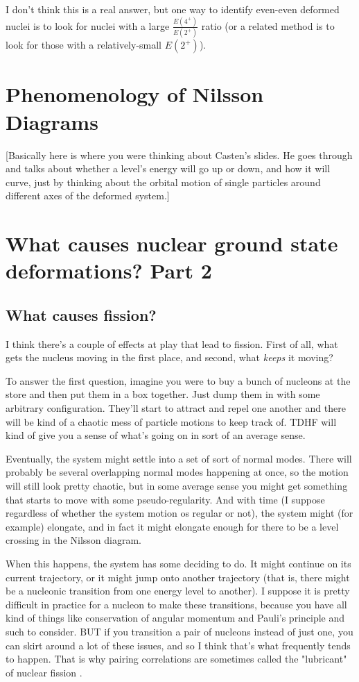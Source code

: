 I don't think this is a real answer, but one way to identify even-even deformed nuclei is to look for nuclei with a large $\frac{E(4^+)}{E(2^+)}$ ratio (or a related method is to look for those with a relatively-small $E(2^+)$).

\section{Phenomenology of Nilsson Diagrams}

[Basically here is where you were thinking about Casten's slides. He goes through and talks about whether a level's energy will go up or down, and how it will curve, just by thinking about the orbital motion of single particles around different axes of the deformed system.]

\section{What causes nuclear ground state deformations? Part 2}
\subsection{What causes fission?}

I think there's a couple of effects at play that lead to fission. First of all, what gets the nucleus moving in the first place, and second, what \textit{keeps} it moving?

To answer the first question, imagine you were to buy a bunch of nucleons at the store and then put them in a box together. Just dump them in with some arbitrary configuration. They'll start to attract and repel one another and there will be kind of a chaotic mess of particle motions to keep track of. TDHF will kind of give you a sense of what's going on in sort of an average sense.

Eventually, the system might settle into a set of sort of normal modes. There will probably be several overlapping normal modes happening at once, so the motion will still look pretty chaotic, but in some average sense you might get something that starts to move with some pseudo-regularity. And with time (I suppose regardless of whether the system motion os regular or not), the system might (for example) elongate, and in fact it might elongate enough for there to be a level crossing in the Nilsson diagram.

When this happens, the system has some deciding to do. It might continue on its current trajectory, or it might jump onto another trajectory (that is, there might be a nucleonic transition from one energy level to another). I suppose it is pretty difficult in practice for a nucleon to make these transitions, because you have all kind of things like conservation of angular momentum and Pauli's principle and such to consider. BUT if you transition a pair of nucleons instead of just one, you can skirt around a lot of these issues, and so I think that's what frequently tends to happen. That is why pairing correlations are sometimes called the "lubricant" of nuclear fission \cite{Bulgac2016}.